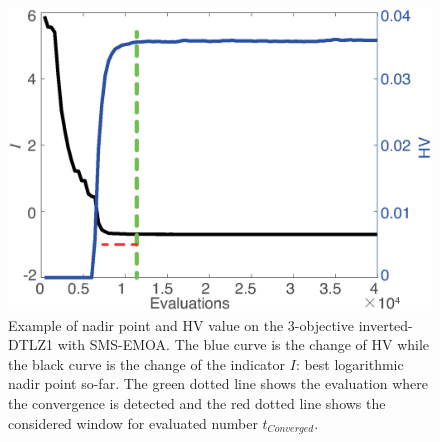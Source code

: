 \documentclass[conference]{IEEEtran}
\begin{document}
\begin{figure}[!t]
  \centering
    \includegraphics[width=\columnwidth]{FVEMOA_IDTLZ1_M3_nadir_1}
  \caption{Example of nadir point and HV value on the 3-objective inverted-DTLZ1
  with SMS-EMOA.
  The blue curve is the change of HV 
  while the black curve is the change of the indicator $I$: best logarithmic nadir point so-far.
  The green dotted line shows the evaluation where the convergence is detected 
  and the red dotted line shows the considered window for evaluated number $t_{Converged}$. 
  }
  \label{wcd1}
\end{figure}
\end{document}
